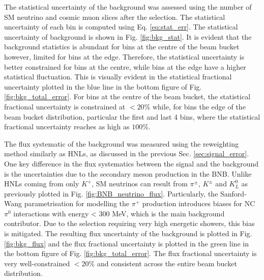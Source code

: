 The statistical uncertainty of the background was assessed using the number of SM neutrino and cosmic muon slices after the selection.
The statistical uncertainty of each bin is computed using Eq. \ref{eq:stat_err}.
The statistical uncertainty of background is shown in Fig. \ref{fig:bkg_stat}.
It is evident that the background statistics is abundant for bins at the centre of the beam bucket however, limited for bins at the edge.
Therefore, the statistical uncertainty is better constrained for bins at the centre, while bins at the edge have a higher statistical fluctuation.
This is visually evident in the statistical fractional uncertainty plotted in the blue line in the bottom figure of Fig. \ref{fig:bkg_total_error}.
For bins at the centre of the beam bucket, the statistical fractional uncertainty is constrained at $< 20\%$ while, for bins the edge of the beam bucket distribution, particular the first and last 4 bins, where the statistical fractional uncertainty reaches as high as $100\%$.

The flux systematic of the background was measured using the reweighting method similarly as HNLs, as discussed in the previous Sec. \ref{sec:signal_error}.
One key difference in the flux systematics between the signal and the background is the uncertainties due to the secondary meson production in the BNB.
Unlike HNLs coming from only $K^+$, SM neutrinos can result from $\pi^\pm$, $K^\pm$ and $K^0_L$ as previously plotted in Fig. \ref{fig:BNB_neutrino_flux}.
Particularly, the Sanford-Wang parametrisation for modelling the $\pi^+$ production introduces biases for NC $\pi^0$ interactions with energy < 300 MeV, which is the main background contributor.
Due to the selection requiring very high energetic showers, this bias is mitigated.
The resulting flux uncertainty of the background is plotted in Fig. \ref{fig:bkg_flux} and the flux fractional uncertainty is plotted in the green line in the bottom figure of Fig. \ref{fig:bkg_total_error}.
The flux fractional uncertainty is very well-constrained $<20 \%$ and consistent across the entire beam bucket distribution.

